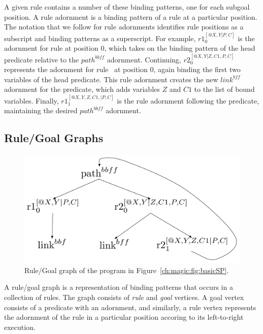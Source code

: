 A given rule contains a number of these binding patterns, one for each subgoal
position.  A rule adornment is a binding pattern of a rule at a particular
position.  The notation that we follow for rule adornments identifies rule
positions as a subscript and binding patterns as a superscript.  For example,
$r1_0^{[@X,Y|P,C]}$ is the adornment for rule  at position $0$, which
takes on the binding pattern of the head predicate relative to the
$path^{bbff}$ adornment.  Continuing, $r2_0^{[@X,Y|Z,C1,P,C]}$ represents the
adornment for rule~ at position $0$, again binding the first two
variables of the head predicate.  This rule adornment creates the new
$link^{bff}$ adornment for the  predicate, which adds variables $Z$
and $C1$ to the list of bound variables.  Finally, $r1_1^{[@X,Y,Z,C1,|P,C]}$ is
the rule adornment following the  predicate, maintaining the desired
$path^{bbff}$ adornment.

\subsection{Rule/Goal Graphs}

\begin{figure}[!t]
\begin{center}
\includegraphics[scale=0.5]{figures/RuleGoalGraph}
\caption{\label{ch:magic:fig:rggraph}Rule/Goal graph of the program in Figure~\ref{ch:magic:fig:basicSP}.}
\end{center}
\end{figure}

A rule/goal graph is a representation of binding patterns that occurs in a
collection of rules.  The graph consists of \emph{rule} and \emph{goal}
vertices.  A goal vertex consists of a predicate with an adornment, and
similarly, a rule vertex represents the adornment of the rule in a particular
position accoring to its left-to-right execution.

